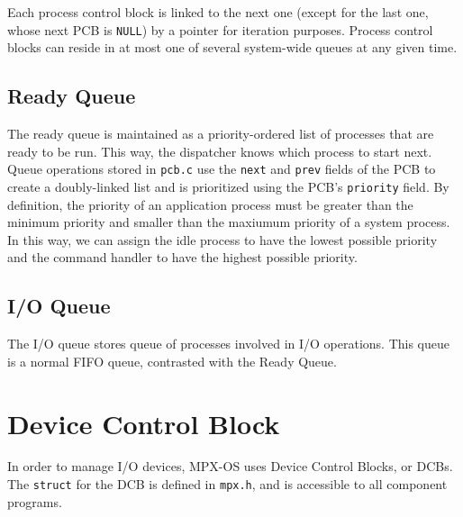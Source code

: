 Each process control block is linked to the next one (except for the last one, whose next PCB is {\tt NULL}) by a pointer for iteration purposes. Process control blocks can reside in at most one of several system-wide queues at any given time.

\subsection{Ready Queue}

The ready queue is maintained as a priority-ordered list of processes that are ready to be run. This way, the dispatcher knows which process to start next. Queue operations stored in {\tt pcb.c} use the {\tt next} and {\tt prev} fields of the PCB to create a doubly-linked list and is prioritized using the PCB's {\tt priority} field. By definition, the priority of an application process must be greater than the minimum priority and smaller than the maxiumum priority of a system process. In this way, we can assign the idle process to have the lowest possible priority and the command handler to have the highest possible priority.

\subsection{I/O Queue}

The I/O queue stores queue of processes involved in I/O operations. This queue is a normal FIFO queue, contrasted with the Ready Queue.

\section{Device Control Block}
\label{device_control_block}

In order to manage I/O devices, MPX-OS uses Device Control Blocks, or DCBs. The {\tt struct} for the DCB is defined in {\tt mpx.h}, and is accessible to all component programs.


